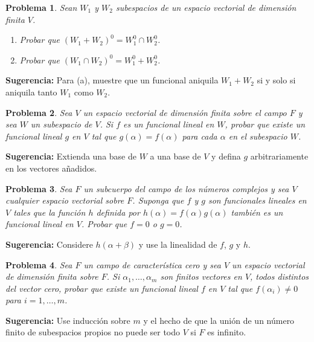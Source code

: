 \documentclass[12pt,a4paper]{article}
\newtheorem{problem}{Problema}
\newenvironment{suggestion}{\par\noindent\textbf{Sugerencia: }}{}
\begin{document}
\begin{problem}
Sean $W_1$ y $W_2$ subespacios de un espacio vectorial de dimensión finita $V$.
\begin{enumerate}
\item Probar que $(W_1+W_2)^0=W_1^0\cap W_2^0$.
\item Probar que $(W_1\cap W_2)^0=W_1^0+W_2^0$.
\end{enumerate}
\end{problem}
\begin{suggestion}
Para (a), muestre que un funcional aniquila $W_1+W_2$ si y solo si aniquila tanto $W_1$ como $W_2$.
\end{suggestion}

\begin{problem}
Sea $V$ un espacio vectorial de dimensión finita sobre el campo $F$ y sea $W$ un subespacio de $V$. Si $f$ es un funcional lineal en $W$, probar que existe un funcional lineal $g$ en $V$ tal que $g(\alpha)=f(\alpha)$ para cada $\alpha$ en el subespacio $W$.
\end{problem}
\begin{suggestion}
Extienda una base de $W$ a una base de $V$ y defina $g$ arbitrariamente en los vectores añadidos.
\end{suggestion}

\begin{problem}
Sea $F$ un subcuerpo del campo de los números complejos y sea $V$ cualquier espacio vectorial sobre $F$. Suponga que $f$ y $g$ son funcionales lineales en $V$ tales que la función $h$ definida por $h(\alpha)=f(\alpha)g(\alpha)$ también es un funcional lineal en $V$. Probar que $f=0$ o $g=0$.
\end{problem}
\begin{suggestion}
Considere $h(\alpha+\beta)$ y use la linealidad de $f$, $g$ y $h$.
\end{suggestion}

\begin{problem}
Sea $F$ un campo de característica cero y sea $V$ un espacio vectorial de dimensión finita sobre $F$. Si $\alpha_1,\dots,\alpha_m$ son finitos vectores en $V$, todos distintos del vector cero, probar que existe un funcional lineal $f$ en $V$ tal que $f(\alpha_i)\neq 0$ para $i=1,\dots,m$.
\end{problem}
\begin{suggestion}
Use inducción sobre $m$ y el hecho de que la unión de un número finito de subespacios propios no puede ser todo $V$ si $F$ es infinito.
\end{suggestion}
\end{document}
